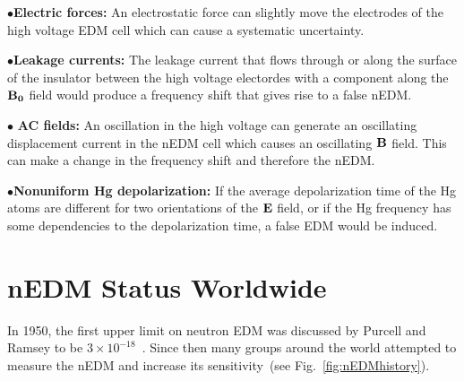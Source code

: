 \begin{description}
\item{$\bullet$\bf{Electric forces:}} An electrostatic force can
  slightly move the electrodes of the high voltage EDM cell which can
  cause a systematic uncertainty.

\item{$\bullet$\bf{Leakage currents:}} The leakage current that flows
  through or along the surface of the insulator between the high
  voltage electordes with a component along the $\bf{B_0}$ field would
  produce a frequency shift that gives rise to a false nEDM.

\item{$\bullet$ \bf{AC fields:}} An oscillation in the high voltage
  can generate an oscillating displacement current in the nEDM cell
  which causes an oscillating $\bf{B}$ field. This can make a change
  in the frequency shift and therefore the nEDM.

\item{$\bullet$\bf{Nonuniform Hg depolarization:}} If the average
  depolarization time of the Hg atoms are different for two
  orientations of the $\bf{E}$ field, or if the Hg frequency has some
  dependencies to the depolarization time, a false EDM would be
  induced.

\end{description}





\section{nEDM Status Worldwide}
In 1950, the first upper limit on neutron EDM was discussed by Purcell
and Ramsey to be $3 \times 10^{-18}$~\cite{PhysRev.78.807}. Since then
many groups around the world attempted to measure the nEDM and
increase its sensitivity~(see Fig.~\ref{fig:nEDMhistory}).

